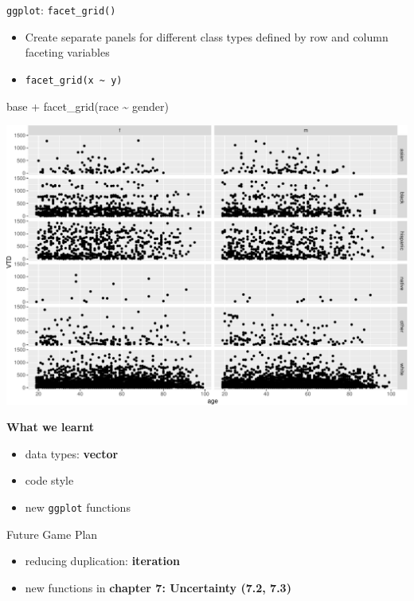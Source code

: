 \documentclass[
  ignorenonframetext,
]{beamer}
\newenvironment{Shaded}{\begin{snugshade}}{\end{snugshade}}
\newcommand{\FunctionTok}[1]{\textcolor[rgb]{0.28,0.35,0.67}{#1}}
\newcommand{\NormalTok}[1]{\textcolor[rgb]{0.00,0.23,0.31}{#1}}
\newcommand{\SpecialCharTok}[1]{\textcolor[rgb]{0.37,0.37,0.37}{#1}}
\providecommand{\tightlist}{%
  \setlength{\itemsep}{0pt}\setlength{\parskip}{0pt}}\usepackage{longtable,booktabs,array}
\begin{document}
\begin{frame}[fragile]{\texttt{ggplot}: \texttt{facet\_grid()}}
\protect\hypertarget{ggplot-facet_grid-2}{}
\begin{itemize}
\tightlist
\item
  Create separate panels for different class types defined by row and
  column faceting variables
\item
  \texttt{facet\_grid(x\ \textasciitilde{}\ y)}
\end{itemize}

\begin{Shaded}
\begin{Highlighting}[]
\NormalTok{base }\SpecialCharTok{+}
  \FunctionTok{facet\_grid}\NormalTok{(race }\SpecialCharTok{\textasciitilde{}}\NormalTok{ gender)}
\end{Highlighting}
\end{Shaded}
\end{frame}

\begin{frame}
\includegraphics{uncertainty-tidy-1_files/figure-beamer/unnamed-chunk-19-1.pdf}
\end{frame}

\begin{frame}[fragile]{\textbf{What we learnt}}
\protect\hypertarget{what-we-learnt}{}
\begin{itemize}
\tightlist
\item
  data types: \textbf{vector}
\item
  code style
\item
  new \texttt{ggplot} functions
\end{itemize}
\end{frame}

\begin{frame}{Future Game Plan}
\protect\hypertarget{future-game-plan}{}
\begin{itemize}
\tightlist
\item
  reducing duplication: \textbf{iteration}
\item
  new functions in \textbf{chapter 7: Uncertainty (7.2, 7.3)}
\end{itemize}
\end{frame}
\end{document}
